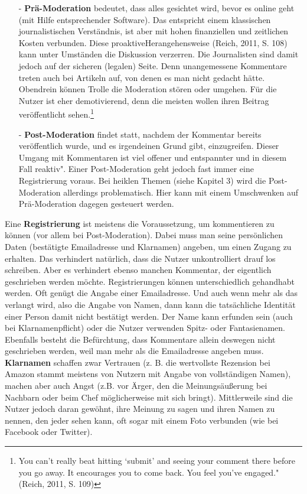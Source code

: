 \begin{itemize}
\item[-] {\bfseries Prä-Moderation} bedeutet, dass alles gesichtet wird, bevor es online geht (mit Hilfe entsprechender Software). Das entspricht einem klassischen journalistischen Verständnis, ist aber mit hohen finanziellen und zeitlichen Kosten verbunden. Diese \glqq proaktive\grqq Herangehensweise (Reich, 2011, S. 108) kann unter Umständen die Diskussion verzerren. Die Journalisten sind damit jedoch auf der sicheren (legalen) Seite. Denn unangemessene Kommentare treten auch bei Artikeln auf, von denen es man nicht gedacht hätte. Obendrein können \glqq Trolle\grqq\- die Moderation stören oder umgehen. Für die Nutzer ist  eher demotivierend, denn die meisten wollen ihren Beitrag veröffentlicht sehen.\footnote{\glqq You can’t really beat hitting ‘submit’ and seeing your comment there before you go
away. It encourages you to come back. You feel you’ve engaged." (Reich, 2011, S. 109)}
\item[-] {\bfseries Post-Moderation} findet statt, nachdem der Kommentar bereits veröffentlich wurde, und es irgendeinen Grund gibt, einzugreifen. Dieser Umgang mit Kommentaren ist viel offener und entspannter und in diesem Fall \glqq reaktiv". Einer Post-Moderation geht jedoch fast immer eine Registrierung voraus. Bei heiklen Themen (siehe Kapitel 3) wird die Post-Moderation allerdings problematisch. Hier kann mit einem Umschwenken auf Prä-Moderation dagegen gesteuert werden.
\end{itemize}
Eine {\bfseries Registrierung} ist meistens die Voraussetzung, um kommentieren zu können (vor allem bei Post-Moderation). Dabei muss man seine persönlichen Daten (be\-stä\-tig\-te Emailadresse und Klarnamen) angeben, um einen Zugang zu erhalten. Das verhindert natürlich, dass die Nutzer unkontrolliert drauf los schreiben. Aber es verhindert ebenso manchen Kommentar, der eigentlich geschrieben werden möchte. 
Registrierungen können unterschiedlich gehandhabt werden. Oft genügt die Angabe einer Emailadresse. Und auch wenn mehr als das verlangt wird, also die Angabe von Namen, dann kann die tatsächliche Identität einer Person damit nicht bestätigt werden. Der Name kann erfunden sein (auch bei Klarnamenpflicht) oder die Nutzer verwenden Spitz- oder Fantasienamen. Ebenfalls besteht die Befürchtung, dass Kommentare allein deswegen nicht geschrieben werden, weil man mehr als die Emailadresse angeben muss. 
{\bfseries Klarnamen} schaffen zwar Vertrauen (z. B. die wertvollste Rezension bei Amazon stammt meistens von Nutzern mit Angabe von vollständigen Namen), machen aber auch Angst (z.B. vor Ärger, den die Meinungsäußerung bei Nachbarn oder beim Chef möglicherweise mit sich bringt). Mittlerweile sind die Nutzer jedoch daran gewöhnt, ihre Meinung zu sagen und ihren Namen zu nennen, den jeder sehen kann, oft sogar mit einem Foto verbunden (wie bei Facebook oder Twitter). 


